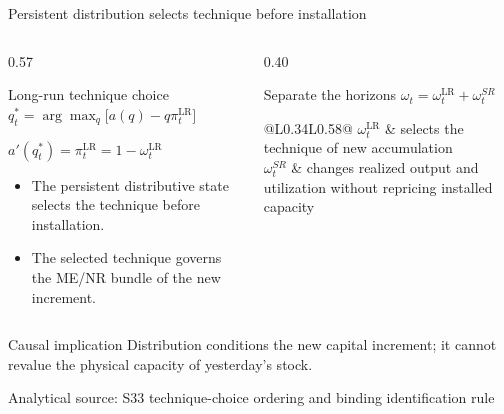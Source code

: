 \documentclass[10pt,aspectratio=169]{beamer}
\newcommand{\LR}{\mathrm{LR}}
\newcommand{\sourcefooter}[1]{%
  \par\vfill{\tiny\color{gray!70}Analytical source: #1}\vspace{-0.35em}}
\begin{document}
\begin{frame}{Persistent distribution selects technique before installation}
  \begin{columns}[T,onlytextwidth]
    \begin{column}{0.57\textwidth}
      \begin{block}{Long-run technique choice}
        \centering
        $\displaystyle
        q_t^*=\arg\max_q\bigl[a(q)-q\pi_t^{\LR}\bigr]$

        \vspace{0.55em}
        \Large $a'(q_t^*)=\pi_t^{\LR}=1-\omega_t^{\LR}$
      \end{block}
      \begin{itemize}\small
        \item The persistent distributive state selects the technique before installation.
        \item The selected technique governs the ME/NR bundle of the new increment.
      \end{itemize}
    \end{column}
    \begin{column}{0.40\textwidth}
      \begin{block}{Separate the horizons}
        \centering
        $\displaystyle \omega_t=\omega_t^{\LR}+\omega_t^{SR}$
        \vspace{0.3em}

        \begin{tabular}{@{}L{0.34\linewidth}L{0.58\linewidth}@{}}
          $\omega_t^{\LR}$ & selects the technique of new accumulation \\
          \addlinespace[0.5em]
          $\omega_t^{SR}$ & changes realized output and utilization without repricing installed capacity
        \end{tabular}
      \end{block}
    \end{column}
  \end{columns}
  \begin{alertblock}{Causal implication}
    Distribution conditions the new capital increment; it cannot revalue the physical capacity of yesterday's stock.
  \end{alertblock}
  \sourcefooter{S33 technique-choice ordering and binding identification rule}
\end{frame}
\end{document}
